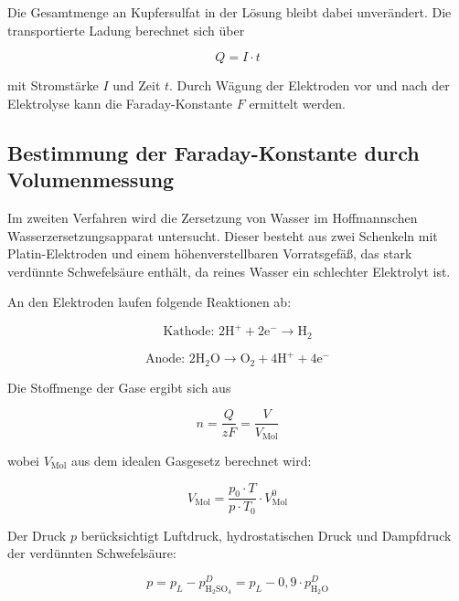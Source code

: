 Die Gesamtmenge an Kupfersulfat in der Lösung bleibt dabei unverändert. Die transportierte Ladung berechnet sich über

\begin{equation}
Q = I \cdot t
\label{eq:ladung}
\end{equation}

mit Stromstärke $I$ und Zeit $t$. Durch Wägung der Elektroden vor und nach der Elektrolyse kann die Faraday-Konstante $F$ ermittelt werden.

\subsection{Bestimmung der Faraday-Konstante durch Volumenmessung}

Im zweiten Verfahren wird die Zersetzung von Wasser im Hoffmannschen Wasserzersetzungsapparat untersucht. Dieser besteht aus zwei Schenkeln mit Platin-Elektroden und einem höhenverstellbaren Vorratsgefäß, das stark verdünnte Schwefelsäure enthält, da reines Wasser ein schlechter Elektrolyt ist.  

An den Elektroden laufen folgende Reaktionen ab:

\begin{equation}
\text{Kathode: } 2 \mathrm{H^+ + 2 e^- \rightarrow H_2}
\label{eq:h2_kathode}
\end{equation}

\begin{equation}
\text{Anode: } 2 \mathrm{H_2O \rightarrow O_2 + 4 H^+ + 4 e^-}
\label{eq:o2_anode}
\end{equation}

Die Stoffmenge der Gase ergibt sich aus

\begin{equation}
n = \frac{Q}{zF} = \frac{V}{V_\mathrm{Mol}}
\label{eq:stoffmenge}
\end{equation}

wobei $V_\mathrm{Mol}$ aus dem idealen Gasgesetz berechnet wird:

\begin{equation}
V_\mathrm{Mol} = \frac{p_0 \cdot T}{p \cdot T_0} \cdot V_\mathrm{Mol}^0
\label{eq:molvolumen}
\end{equation}

Der Druck $p$ berücksichtigt Luftdruck, hydrostatischen Druck und Dampfdruck der verdünnten Schwefelsäure:

\begin{equation}
p = p_L - p_\mathrm{H_2SO_4}^D = p_L - 0,9 \cdot p_\mathrm{H_2O}^D
\label{eq:druck}
\end{equation}


